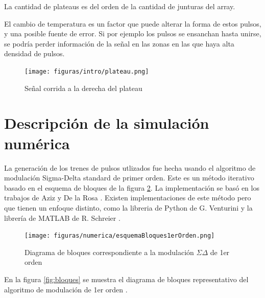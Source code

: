\documentclass[twoside]{article}
\begin{document}
\begin{multicols}{2}
La cantidad de plateaus es del orden de la cantidad de junturas del array. %

El cambio de temperatura es un factor que puede alterar la forma de estos pulsos, y una posible fuente de error. Si por ejemplo los pulsos se ensanchan hasta unirse, se podría perder información de la señal en las zonas en las que haya alta densidad de pulsos.



\begin{figure}[H]
    \centering
    \texttt{[image: figuras/intro/plateau.png]}
    \caption{Señal corrida a la derecha del plateau}
    \label{fig:intro_plateau}
\end{figure}

\section{Descripción de la simulación numérica}

La generación de los trenes de pulsos utlizados fue hecha usando el algoritmo de modulación Sigma-Delta standard de primer orden. Este es un método iterativo basado en el esquema de bloques de la figura \ref{fig:numerica_esquemaBloques1erOrden}. La implementación se basó en los trabajos de Aziz \cite{aziz1996} y De la Rosa \cite{delarosa2011}. Existen implementaciones de este método pero que tienen un enfoque distinto, como la libreria de Python de G. Venturini \cite{DSpython} y la librería de MATLAB de R. Schreier \cite{DSmatlab}.

\begin{figure}[H]
    \centering
    \texttt{[image: figuras/numerica/esquemaBloques1erOrden.png]}
    \caption{Diagrama de bloques correspondiente a la modulación $\Sigma\Delta$ de 1er orden}
    \label{fig:numerica_esquemaBloques1erOrden}
\end{figure}


En la figura \ref{fig:bloques} se muestra el diagrama de bloques representativo del algoritmo de modulación de 1er orden \cite{script}.


\end{multicols}
\end{document}
